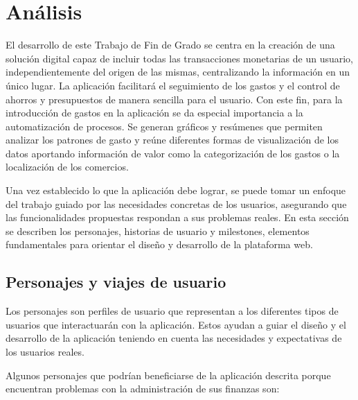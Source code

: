 \chapter{Análisis}

El desarrollo de este Trabajo de Fin de Grado se centra en la creación de una solución digital capaz de incluir todas las transacciones monetarias de un usuario, independientemente del origen de las mismas, centralizando la información en un único lugar. La aplicación facilitará el seguimiento de los gastos y el control de ahorros y presupuestos de manera sencilla para el usuario. Con este fin, para la introducción de gastos en la aplicación se da especial importancia a la automatización de procesos. Se generan gráficos y resúmenes que permiten analizar los patrones de gasto y reúne diferentes formas de visualización de los datos aportando información de valor como la categorización de los gastos o la localización de los comercios.

Una vez establecido lo que la aplicación debe lograr, se puede tomar un enfoque del trabajo guiado por las necesidades concretas de los usuarios, asegurando que las funcionalidades propuestas respondan a sus problemas reales. En esta sección se describen los personajes, historias de usuario y milestones, elementos fundamentales para orientar el diseño y desarrollo de la plataforma web. 

\section{Personajes y viajes de usuario}
Los personajes son perfiles de usuario que representan a los diferentes tipos de usuarios que interactuarán con la aplicación. Estos ayudan a guiar el diseño y el desarrollo de la aplicación teniendo en cuenta las necesidades y expectativas de los usuarios reales.

Algunos personajes que podrían beneficiarse de la aplicación descrita porque encuentran problemas con la administración de sus finanzas son:

